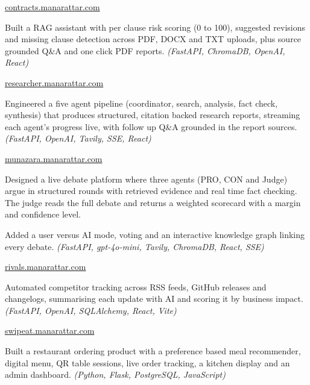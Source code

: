 \documentclass[10pt]{article}
\newcommand{\product}[2]{\Needspace{4\baselineskip}\vspace{2pt}{\bfseries #1}\hfill{\footnotesize #2}\par\vspace{-1pt}}
\newcommand{\live}[2]{\href{https://#1}{\color{link}#2}}
\begin{document}
\product{AI Contract Risk Analyzer}{\live{contracts.manarattar.com}{contracts.manarattar.com}}
\begin{tights}
  \item Built a RAG assistant with per clause risk scoring (0 to 100), suggested revisions and missing clause detection across PDF, DOCX and TXT uploads, plus source grounded Q\&A and one click PDF reports. {\footnotesize\color{gray}\textit{(FastAPI, ChromaDB, OpenAI, React)}}
\end{tights}

\product{Multi Agent Research Assistant}{\live{researcher.manarattar.com}{researcher.manarattar.com}}
\begin{tights}
  \item Engineered a five agent pipeline (coordinator, search, analysis, fact check, synthesis) that produces structured, citation backed research reports, streaming each agent's progress live, with follow up Q\&A grounded in the report sources. {\footnotesize\color{gray}\textit{(FastAPI, OpenAI, Tavily, SSE, React)}}
\end{tights}

\product{Munazara: AI Debate Engine}{\live{munazara.manarattar.com}{munazara.manarattar.com}}
\begin{tights}
  \item Designed a live debate platform where three agents (PRO, CON and Judge) argue in structured rounds with retrieved evidence and real time fact checking. The judge reads the full debate and returns a weighted scorecard with a margin and confidence level.
  \item Added a user versus AI mode, voting and an interactive knowledge graph linking every debate. {\footnotesize\color{gray}\textit{(FastAPI, gpt-4o-mini, Tavily, ChromaDB, React, SSE)}}
\end{tights}

\product{RivalScan: Competitor Intelligence Dashboard}{\live{rivals.manarattar.com}{rivals.manarattar.com}}
\begin{tights}
  \item Automated competitor tracking across RSS feeds, GitHub releases and changelogs, summarising each update with AI and scoring it by business impact. {\footnotesize\color{gray}\textit{(FastAPI, OpenAI, SQLAlchemy, React, Vite)}}
\end{tights}

\product{SwipeEat: Swipe Driven Restaurant Ordering}{\live{swipeat.manarattar.com}{swipeat.manarattar.com}}
\begin{tights}
  \item Built a restaurant ordering product with a preference based meal recommender, digital menu, QR table sessions, live order tracking, a kitchen display and an admin dashboard. {\footnotesize\color{gray}\textit{(Python, Flask, PostgreSQL, JavaScript)}}
\end{tights}
\end{document}
